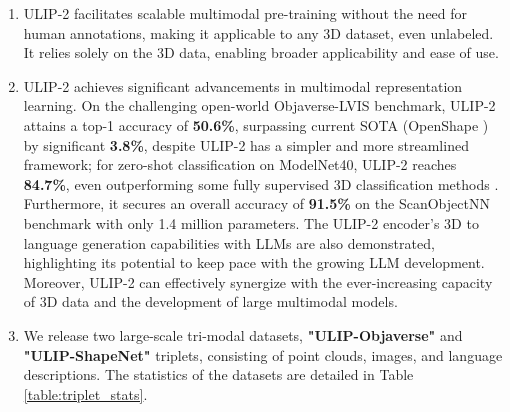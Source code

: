 \documentclass[10pt,twocolumn,letterpaper]{article}
\newcommand{\ning}[1]{\textcolor{blue}{Ning: #1}}
\newcommand{\shu}[1]{\textcolor{red}{\small{[Shu: #1] }}}
\begin{document}
\begin{enumerate}
\item ULIP-2 facilitates scalable multimodal pre-training without the need for human annotations, making it applicable to any 3D dataset, even unlabeled. It relies solely on the 3D data, enabling broader applicability and ease of use.
\item ULIP-2 achieves significant advancements in multimodal representation learning. On the challenging open-world Objaverse-LVIS benchmark, ULIP-2 attains a top-1 accuracy of \textbf{50.6\%}, surpassing current SOTA (OpenShape \citep{liu2023openshape}) by significant \textbf{3.8\%}, despite ULIP-2 has a simpler and more streamlined framework; for zero-shot classification on ModelNet40, ULIP-2 reaches \textbf{84.7\%}, even outperforming some fully supervised 3D classification methods \citep{wu20153d}. Furthermore, it secures an overall accuracy of \textbf{91.5\%} on the ScanObjectNN benchmark with only 1.4 million parameters. The ULIP-2 encoder's 3D to language generation capabilities with LLMs are also demonstrated, highlighting its potential to keep pace with the growing LLM development. Moreover, ULIP-2 can effectively synergize with the ever-increasing capacity of 3D data and the development of large multimodal models.
\item We release two large-scale tri-modal datasets, \textbf{"ULIP-Objaverse"} and \textbf{"ULIP-ShapeNet"} triplets, consisting of point clouds, images, and language descriptions. The statistics of the datasets are detailed in Table \ref{table:triplet_stats}.
\end{enumerate}




\end{document}
